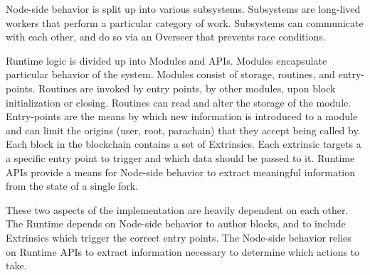 Node-side behavior is split up into various subsystems. Subsystems are
long-lived workers that perform a particular category of work. Subsystems can
communicate with each other, and do so via an Overseer that prevents race
conditions.
\newline

Runtime logic is divided up into Modules and APIs. Modules encapsulate
particular behavior of the system. Modules consist of storage, routines, and
entry-points. Routines are invoked by entry points, by other modules, upon block
initialization or closing. Routines can read and alter the storage of the
module. Entry-points are the means by which new information is introduced to a
module and can limit the origins (user, root, parachain) that they accept being
called by. Each block in the blockchain contains a set of Extrinsics. Each
extrinsic targets a a specific entry point to trigger and which data should be
passed to it. Runtime APIs provide a means for Node-side behavior to extract
meaningful information from the state of a single fork.
\newline

These two aspects of the implementation are heavily dependent on each other. The
Runtime depends on Node-side behavior to author blocks, and to include
Extrinsics which trigger the correct entry points. The Node-side behavior relies
on Runtime APIs to extract information necessary to determine which actions to
take.


